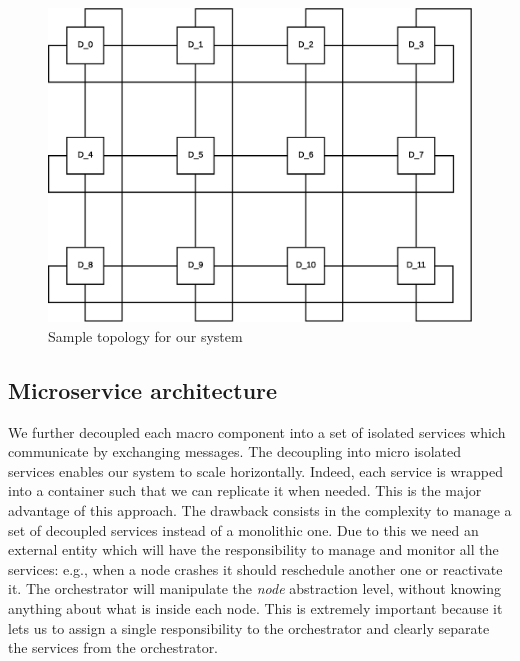 \begin{figure}[H]
  \centering
  \includegraphics[scale=0.5,keepaspectratio]
    {images/solution/topology.eps}
  \caption{Sample topology for our system}
  \label{fig:sd-sys-arch-topology}
\end{figure}


\subsection{Microservice architecture}

We further decoupled each macro component into a set of isolated services
which communicate by exchanging messages. The decoupling into micro isolated
services enables our system to scale horizontally. Indeed, each service is wrapped
into a container such that we can replicate it when needed. This is the major advantage
of this approach. The drawback consists in the complexity to manage a set of decoupled
services instead of a monolithic one. Due to this we need an external entity which
will have the responsibility to manage and monitor all the services: e.g., when a node crashes it should reschedule another one or reactivate it. The orchestrator will
manipulate the \textit{node} abstraction level, without knowing anything about what is inside each node. This is extremely important because it lets us to assign
a single responsibility to the orchestrator and clearly separate the services from
the orchestrator.

